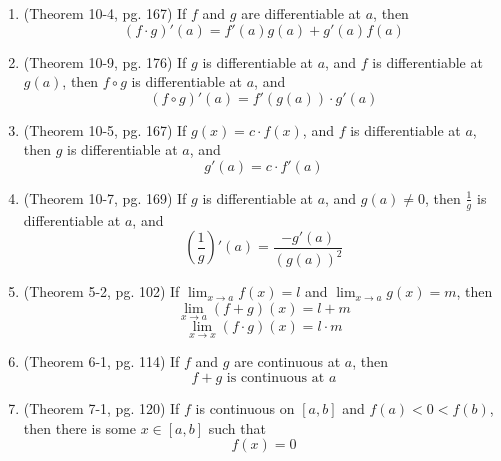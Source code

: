 \documentclass{article}
\begin{document}
\begin{enumerate}
	\item (Theorem 10-4, pg. 167) If $f$ and $g$ are differentiable at $a$, then
	      \begin{equation}
		      (f \cdot g)'(a)=f'(a)g(a)+g'(a)f(a) \label{product-rule}
	      \end{equation}
	\item (Theorem 10-9, pg. 176) If $g$ is differentiable at $a$, and $f$ is differentiable at $g(a)$, then
	      $f \circ g$ is differentiable at $a$, and
	      \begin{equation}
		      (f \circ g)'(a)=f'(g(a))\cdot g'(a) \label{chain-rule}
	      \end{equation}
	\item (Theorem 10-5, pg. 167) If $g(x)=c \cdot f(x)$, and $f$ is differentiable at $a$, then $g$ is differentiable
	      at $a$, and
	      \begin{equation}
		      g'(a)=c \cdot f'(a) \label{product-rule-for-constants}
	      \end{equation}
	\item (Theorem 10-7, pg. 169) If $g$ is differentiable at $a$, and $g(a) \ne 0$, then $\frac1g$ is differentiable at $a$, and
	      \begin{equation}
		      \left( \dfrac{1}{g} \right)'(a)=\dfrac{-g'(a)}{(g(a))^2} \label{ddx-of-1on-g}
	      \end{equation}
	\item (Theorem 5-2, pg. 102) If $\lim_{x \to a}f(x)=l$ and $\lim_{x \to a}g(x)=m$, then
	      \begin{equation}
		      \lim_{x \to a}(f+g)(x) = l+ m \label{limit-of-sums}
	      \end{equation}
	      \begin{equation}
		      \lim_{x \to x}(f \cdot g)(x) =l \cdot m	 \label{limit-of-products}
	      \end{equation}
	\item (Theorem 6-1, pg. 114) If $f$ and $g$ are continuous at $a$, then
	      \begin{equation}
		      f+g \text{ is continuous at }a \label{continuous-sum-is-continuous}
	      \end{equation}
	\item (Theorem 7-1, pg. 120) If $f$ is continuous on $[a,b]$ and $f(a) < 0 < f(b)$, then there is some $x \in [a,b]$ such that
	      \begin{equation}
		      f(x)=0 \label{mean-value}
	      \end{equation}

\end{enumerate}
\end{document}
